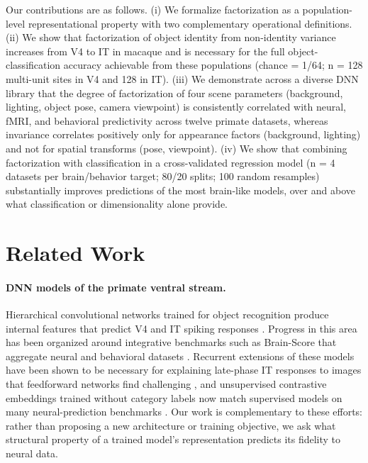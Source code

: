 Our contributions are as follows. (i) We formalize factorization as a population-level representational property with two complementary operational definitions. (ii) We show that factorization of object identity from non-identity variance increases from V4 to IT in macaque and is necessary for the full object-classification accuracy achievable from these populations (chance = 1/64; n = 128 multi-unit sites in V4 and 128 in IT). (iii) We demonstrate across a diverse DNN library that the degree of factorization of four scene parameters (background, lighting, object pose, camera viewpoint) is consistently correlated with neural, fMRI, and behavioral predictivity across twelve primate datasets, whereas invariance correlates positively only for appearance factors (background, lighting) and not for spatial transforms (pose, viewpoint). (iv) We show that combining factorization with classification in a cross-validated regression model (n = 4 datasets per brain/behavior target; 80/20 splits; 100 random resamples) substantially improves predictions of the most brain-like models, over and above what classification or dimensionality alone provide.

\section*{Related Work}

\paragraph{DNN models of the primate ventral stream.}
Hierarchical convolutional networks trained for object recognition produce internal features that predict V4 and IT spiking responses \cite{yamins2014performance,khalighrazavi2014deep,yamins2016using}. Progress in this area has been organized around integrative benchmarks such as Brain-Score that aggregate neural and behavioral datasets \cite{schrimpf2020integrative}. Recurrent extensions of these models have been shown to be necessary for explaining late-phase IT responses to images that feedforward networks find challenging \cite{kar2019evidence}, and unsupervised contrastive embeddings trained without category labels now match supervised models on many neural-prediction benchmarks \cite{zhuang2021unsupervised,chen2020simple,he2020momentum}. Our work is complementary to these efforts: rather than proposing a new architecture or training objective, we ask what structural property of a trained model's representation predicts its fidelity to neural data.

